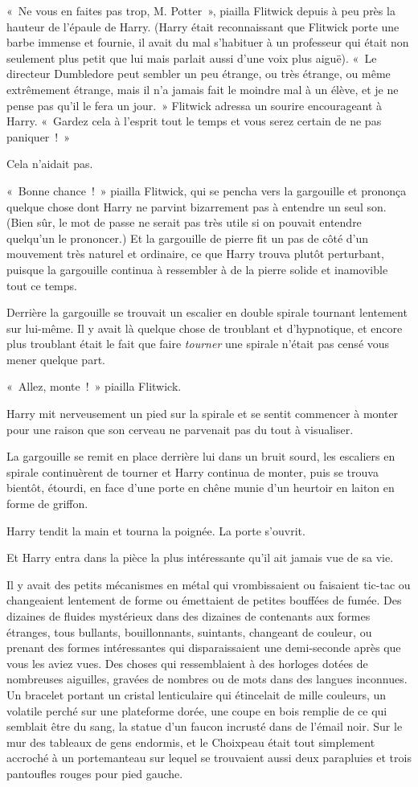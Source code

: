 «~Ne vous en faites pas trop, M. Potter~», piailla Flitwick depuis à peu près la hauteur de l'épaule de Harry.
(Harry était reconnaissant que Flitwick porte une barbe immense et fournie, il avait du mal s'habituer à un professeur qui était non seulement plus petit que lui mais parlait aussi d'une voix plus aiguë).
«~Le directeur Dumbledore peut sembler un peu étrange, ou très étrange, ou même extrêmement étrange, mais il n'a jamais fait le moindre mal à un élève, et je ne pense pas qu'il le fera un jour.~»
Flitwick adressa un sourire encourageant à Harry.
«~Gardez cela à l'esprit tout le temps et vous serez certain de ne pas paniquer~!~»

Cela n'aidait pas.

«~Bonne chance~!~»
piailla Flitwick, qui se pencha vers la gargouille et prononça quelque chose dont Harry ne parvint bizarrement pas à entendre un seul son.
(Bien sûr, le mot de passe ne serait pas très utile si on pouvait entendre quelqu'un le prononcer.)
Et la gargouille de pierre fit un pas de côté d'un mouvement très naturel et ordinaire, ce que Harry trouva plutôt perturbant, puisque la gargouille continua à ressembler à de la pierre solide et inamovible tout ce temps.

Derrière la gargouille se trouvait un escalier en double spirale tournant lentement sur lui-même.
Il y avait là quelque chose de troublant et d'hypnotique, et encore plus troublant était le fait que faire \emph{tourner} une spirale n'était pas censé vous mener quelque part.

«~Allez, monte~!~»
piailla Flitwick.

Harry mit nerveusement un pied sur la spirale et se sentit commencer à monter pour une raison que son cerveau ne parvenait pas du tout à visualiser.

La gargouille se remit en place derrière lui dans un bruit sourd, les escaliers en spirale continuèrent de tourner et Harry continua de monter, puis se trouva bientôt, étourdi, en face d'une porte en chêne munie d'un heurtoir en laiton en forme de griffon.

Harry tendit la main et tourna la poignée.
La porte s'ouvrit.

Et Harry entra dans la pièce la plus intéressante qu'il ait jamais vue de sa vie.

Il y avait des petits mécanismes en métal qui vrombissaient ou faisaient tic-tac ou changeaient lentement de forme ou émettaient de petites bouffées de fumée.
Des dizaines de fluides mystérieux dans des dizaines de contenants aux formes étranges, tous bullants, bouillonnants, suintants, changeant de couleur, ou prenant des formes intéressantes qui disparaissaient une demi-seconde après que vous les aviez vues.
Des choses qui ressemblaient à des horloges dotées de nombreuses aiguilles, gravées de nombres ou de mots dans des langues inconnues.
Un bracelet portant un cristal lenticulaire qui étincelait de mille couleurs, un volatile perché sur une plateforme dorée, une coupe en bois remplie de ce qui semblait être du sang, la statue d'un faucon incrusté dans de l'émail noir.
Sur le mur des tableaux de gens endormis, et le Choixpeau était tout simplement accroché à un portemanteau sur lequel se trouvaient aussi deux parapluies et trois pantoufles rouges pour pied gauche.

